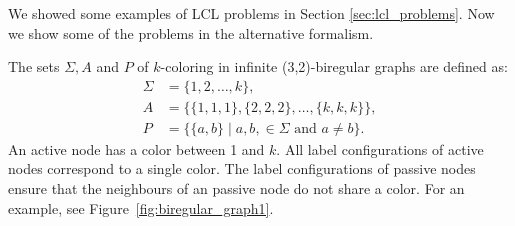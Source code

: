 We showed some examples of LCL problems in Section \ref{sec:lcl_problems}.
Now we show some of the problems in the alternative formalism.

The sets $\Sigma, A$ and $P$ of $k$-coloring in infinite (3,2)-biregular graphs are defined as:
\begin{align*}
  \Sigma &= \{1, 2, \dotsc, k\}, \\
  A &= \{\{1,1,1\},\{2,2,2\},\dotsc,\{k,k,k\}\}, \\
  P &= \{\{a, b\}\mid a,b,\in \Sigma \text{ and } a \neq b\}.
\end{align*}
An active node has a color between 1 and $k$.
All label configurations of active nodes correspond to a single color.
The label configurations of passive nodes ensure that the neighbours of an passive node do not share a color.
For an example, see Figure~\ref{fig:biregular_graph1}.


